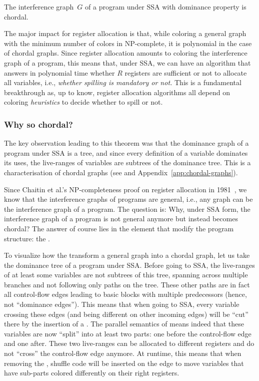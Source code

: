 {\begin{theorem}
  \label{thm:ssa-chordal}
  The interference graph~$G$ of a program under \ac{SSA} with dominance 
  property is chordal.
\end{theorem}

The major impact for register allocation is that, while coloring a general graph 
with the minimum number of colors in NP-complete, it is polynomial in the case 
of chordal graphs. Since register allocation amounts to coloring the 
interference graph of a program, this means that, under SSA, we can have an
algorithm that answers in polynomial time whether $R$ registers are sufficient 
or not to allocate all variables, i.e., \emph{whether spilling is mandatory 
or not.} This is a fundamental breakthrough as, up to know, register 
allocation algorithms all depend on coloring \emph{heuristics} to decide 
whether to spill or not.




\subsubsection{Why so chordal?}

The key observation leading to this theorem was that the dominance graph of a 
program under SSA is a tree, and since every definition of a variable dominates  
its uses, the live-ranges of variables are subtrees of the dominance tree. This 
is a characterisation of chordal graphs (see \cite[Thm.~4.8]{Golumbic} and 
Appendix~\ref{app:chordal-graphs}).


Since Chaitin et al.'s NP-completeness proof on register allocation in 
1981~\cite{Chaitin81}, we know that the interference graphs of programs are 
general, i.e., any graph can be the interference graph of a program. The 
question is: Why, under SSA form, the interference graph of a program is not 
general anymore but instead becomes chordal? The answer of course lies in the 
element that modify the program structure: the \phifuns.

To visualize how the \phifuns transform a general graph into a chordal graph, 
let us take the dominance tree of a program under SSA. Before going to SSA, the 
live-ranges of at least some variables are not subtrees of this tree,
spanning across multiple branches and not following only paths on 
the tree. These other paths are in fact all control-flow edges leading to basic 
blocks with multiple predecessors (hence, not ``dominance edges''). This means 
that when going to SSA, every variable crossing these edges (and being 
different on other incoming edges) will be ``cut'' there by the insertion of a 
\phifun. The parallel semantics of \phifuns means indeed that these variables 
are now ``split'' into at least two parts: one before the control-flow edge and 
one after. These two live-ranges can be allocated to different registers and do 
not ``cross'' the control-flow edge anymore. At runtime, this means that when 
removing the \phifun, shuffle code will be inserted on the edge to move 
variables that have sub-parts colored differently on their right registers.



}
